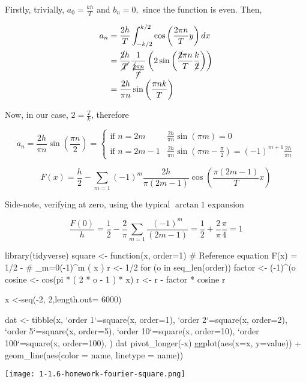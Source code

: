 \documentclass[../main/main.tex]{subfiles}
\begin{document}
	Firstly, trivially, $a_{0}=\frac{kh}{T}$ and $b_{n} = 0,$ since the function is even.
	Then,

	\begin{align*}
	a_{n} &= \frac{2h}{T} \fourier[-k/2][k/2]{ \cos\left(\frac{2\pi n}{T} y\right)} \\
		&= \frac{\cancel{2}h}{\cancel{T}}\frac{1}{\frac{\cancel{2}\pi n}{\cancel{T}}}\left( 2\sin\left(\frac{\cancel{2}\pi n}{T} \frac{k}{\cancel{2}}\right)  \right)\\
		&= \frac{2h}{\pi n} \sin\left(\frac{\pi n k}{T} \right)
	\end{align*}

	Now, in our case, $2 = \frac T k$, therefore

	\begin{equation*}
	a_{n} = \frac{2h}{\pi n} \sin\left(\frac{\pi n }{2} \right) =
	\begin{cases}
	\textrm{if $n=2m$ } & \frac{2h}{\pi n} \sin\left(\pi m  \right) = 0\\
	\textrm{if $n=2m-1$} &\frac{2h}{\pi n} \sin\left(\pi m - \frac \pi 2\right) = (-1)^{m+1}\frac{2h }{\pi n}
	\end{cases}
	\end{equation*}

	\begin{equation*}
	\boxed{
		F(x) = \frac{h}{2} -
			\sum_{m=1}(-1)^{m}\frac{2h }{\pi (2m-1)}
				\cos\left(\frac{\pi (2m -1)}{T} x \right)
	}
	\end{equation*}

Side-note, verifying at zero, using the typical $\arctan 1$ expansion

	\begin{equation*}
	\frac{F(0)}{h}
	= \frac{1}{2} - \frac 2 \pi \sum_{m=1}\frac{(-1)^{m}}{(2m-1)}
	= \frac{1}{2} + \frac 2 \pi  \frac \pi 4
	= 1
	\end{equation*}

\pagebreak
\begin{center}

\begin{rcode}
library(tidyverse)
square <- function(x, order=1) {
#  Reference equation F(x) = 1/2 -
#    \sum_{m=0}(-1)^{m} \cos( x )
  r <- 1/2
  for (o in seq_len(order)) {
    factor <- (-1)^(o %
    cosine <- cos(pi * ( 2 * o - 1 ) * x)
    r <- r - factor * cosine
  }
  r
}

x <-seq(-2, 2,length.out= 6000)

dat <- tibble(x,
             `order 1`=square(x, order=1),
             `order 2`=square(x, order=2),
             `order 5`=square(x, order=5),
             `order 10`=square(x, order=10),
             `order 100`=square(x, order=100),
)
dat %
  pivot_longer(-x) %
  ggplot(aes(x=x, y=value)) +
  geom_line(aes(color = name, linetype = name))
\end{rcode}
\texttt{[image: 1-1.6-homework-fourier-square.png]}
\end{center}
\end{document}
